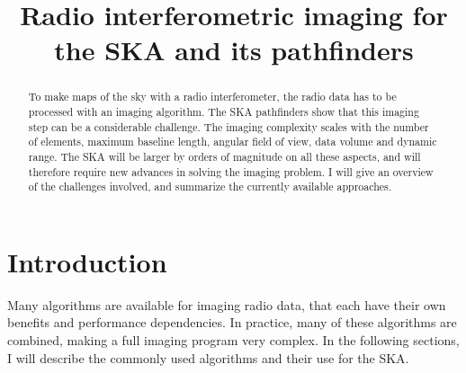 \documentclass[9pt,conference,a4paper]{IEEEtran}
\begin{document}
\title{Radio interferometric imaging for the SKA and its pathfinders}

\author{%
%
%
} %

\maketitle


\begin{abstract}
To make maps of the sky with a radio interferometer, the radio data has to be processed with an imaging algorithm. The SKA pathfinders show that this imaging step can be a considerable challenge. The imaging complexity scales with the number of elements, maximum baseline length, angular field of view, data volume and dynamic range. The SKA will be larger by orders of magnitude on all these aspects, and will therefore require new advances in solving the imaging problem. I will give an overview of the challenges involved, and summarize the currently available approaches.\end{abstract}

\section{Introduction}
Many algorithms are available for imaging radio data, that each have their own benefits and performance dependencies. In practice, many of these algorithms are combined, making a full imaging program very complex. In the following sections, I will describe the commonly used algorithms and their use for the SKA.
\end{document}
